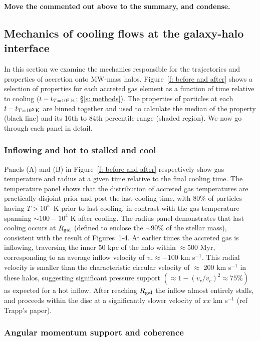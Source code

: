 \documentclass[fleqn,usenatbib]{mnras}
\newcommand{\tcon}{t_{T=10^5\,{\rm K}}}
\begin{document}
\textbf{Move the commented out above to the summary, and condense.}

\subsection{Mechanics of cooling flows at the galaxy-halo interface}
\label{s: mechanics}

In this section we examine the mechanics responsible for the trajectories and properties of accretion onto MW-mass halos.
Figure~\ref{f: before and after} shows a selection of properties for each accreted gas element as a function of time relative to cooling  ($t - \tcon$; \S\ref{s: methods}).
The properties of particles at each $t - \tcon$ are binned together and used to calculate the median of the property (black line) and its 16th to 84th percentile range (shaded region).
We now go through each panel in detail.

\subsubsection{Inflowing and hot to stalled and cool}
\label{s: mechanics -- temp and radius}
Panels (A) and (B) in Figure~\ref{f: before and after} respectively show gas temperature and radius at a given time relative to the final cooling time.
The temperature panel shows that the distribution of accreted gas temperatures are practically disjoint prior and post the last cooling time, with $80\%$ of particles having $T > 10^5$~K prior to last cooling, in contrast with the gas temperature spanning $\sim100- 10^4$ K after cooling. 
The radius panel demonstrates that last cooling occurs at $R_{\rm gal}$ (defined to enclose the $\sim90\%$ of the stellar mass), consistent with the result of  Figures~1-4.
At earlier times the accreted gas is inflowing, traversing the inner 50 kpc of the halo within $\approx500$ Myr, corresponding to an average inflow velocity of $v_r\approx-100$ km s$^{-1}$.
This radial velocity is smaller than the characteristic circular velocity of $\approx$ 200 km s$^{-1}$ in these halos, suggesting significant pressure support $(\approx1-(v_r/v_c)^2\approx75\%)$ as expected for a hot inflow.
After reaching $R_{\rm gal}$ the inflow almost entirely stalls, and proceeds within the disc at a significantly slower velocity of $xx$ km s$^{-1}$ (ref Trapp's paper). 

\subsubsection{Angular momentum support and coherence}
\label{s: mechanics -- angular momentum}
\end{document}
